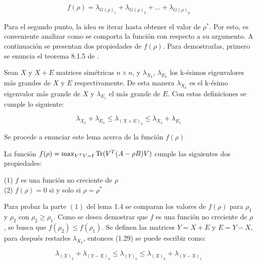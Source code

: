 \begin{equation}\label{eq:2.30}
f(\rho) = \lambda_{G(\rho)_1} + \lambda_{G(\rho)_2} + ... +\lambda_{G(\rho)_p}
\end{equation}


Para el segundo punto, la idea es iterar hasta obtener el valor de $\rho^*$. Por esto, es conveniente analizar como se comporta la función con respecto a su argumento. A continuación se presentan dos propiedades de $f(\rho)$. Para demostrarlas, primero se enuncia el teorema 8.1.5 de \cite{golub2012matrix}.

\begin{theorem} \label{teorem.1}
	
	Sean $X$ y $X+E$ matrices simétricas $n \times n$, y $\lambda_{X_k}$, $\lambda_{E_k}$ los k-ésimos eigenvalores más grandes de $X$ y $E$ respectivamente. De esta manera $\lambda_{X_k}$ es el k-ésimo eigenvalor más grande de $X$ y $\lambda_{E_1}$ el más grande de $E$. Con estas definiciones se cumple lo siguiente:

	\begin{equation}\label{eq:2.31}
		\lambda_{X_k} +\lambda_{E_n} \leq \lambda_{(X+E)_k} \leq \lambda_{X_k} +\lambda_{E_1}
	\end{equation}

\end{theorem}

Se procede a enunciar este lema acerca de la función $f(\rho)$

\begin{lemma}\label{lemma2.6}
La función $f(\rho) = \max_{V^T V = I} \operatorname{Tr}(V^T (A - \rho B) V)$ cumple las siguientes dos propiedades: 

(1) $f$ es una función no creciente de $\rho$ \\
(2) $f(\rho)= 0$  si y solo si $\rho = \rho^*$
\end{lemma}

Para probar la parte $(1)$ del lema 1.4 se comparan los valores de $f(\rho)$ para $\rho_1$ y $\rho_2$ con $\rho_2 \geq \rho_1$. Como se desea demostrar que $f$ es una función no creciente de $\rho$, se busca que $f(\rho_2) \leq f(\rho_1)$. Se definen las matrices $Y=X+E$ y $E = Y-X$, para después restarles $\lambda_{X_k}$, entonces (1.29) se puede escribir como:

\begin{equation*}
		\lambda_{(X)_k} +\lambda_{(Y-X)_n} \leq \lambda_{(Y)_k} \leq \lambda_{(X)_k} +\lambda_{(Y-X)_1}
\end{equation*}

